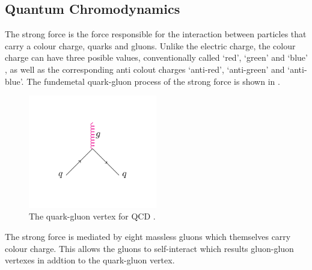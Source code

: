 \subsection{Quantum Chromodynamics}
\label{sec:QCD}
The strong force is the force responsible for the interaction between particles
that carry a colour charge, quarks and gluons. Unlike the electric charge, the
colour charge can have three posible values, conventionally called `red',
`green' and `blue' , as well as the corresponding anti colout charges
`anti-red', `anti-green' and `anti-blue'.
The fundemetal quark-gluon process of the strong force is shown in
.
\begin{figure}[htbp]
  \centering
  \includegraphics[width=0.5\textwidth]{qcd_process}
  \caption{The quark-gluon vertex for \ac{QCD} .}
  \label{fig:qcdquark}
\end{figure}
The strong force is mediated by eight massless gluons which themselves carry
colour charge. This allows the gluons to self-interact which results gluon-gluon
vertexes in addtion to the quark-gluon vertex.

